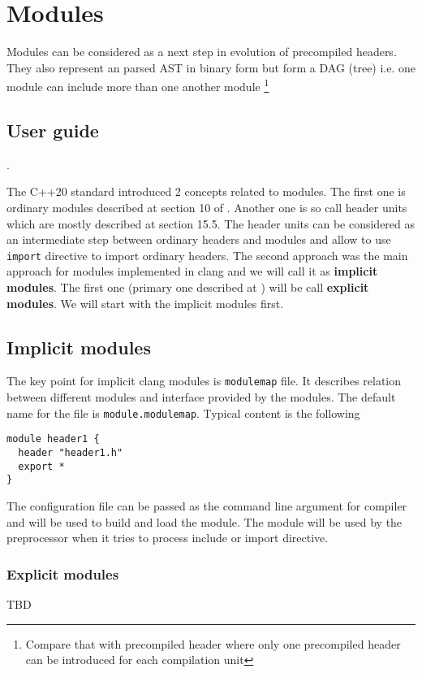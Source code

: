 \section{Modules}
Modules can be considered as a next step in evolution of precompiled
headers. They also represent an parsed AST in binary form but form a
DAG (tree) i.e. one module can include more than one another module
\footnote{Compare that with precompiled header where only one
precompiled header can be introduced for each compilation unit}
\subsection{User guide}.

The C++20 standard \cite{book:ieee_cpp_20} introduced 2 concepts
related to modules. The first one is ordinary modules described at
section 10 of \cite{book:ieee_cpp_20}. Another one is so call header
units   which are mostly described at section 15.5.
The header units can be considered as an intermediate step between
ordinary headers and modules and allow to use
\texttt{import} directive to import ordinary headers. The
second approach was the main approach for modules implemented in clang
and we will call it as \textbf{implicit modules}. The first one (primary one
described at \cite{book:ieee_cpp_20}) will be call \textbf{explicit
  modules}. We will start with the implicit modules first.

\subsection{Implicit modules}
The key point for implicit clang modules is \texttt{modulemap}
file. It describes relation between different modules and interface
provided by the modules. The default name for the file is
\texttt{module.modulemap}. Typical content is the following
\begin{verbatim}
module header1 {
  header "header1.h"
  export *
}
\end{verbatim}
The configuration file can be passed as the command line argument for
compiler and will be used to build and load the module. The module
will be used by the preprocessor when it tries to process include or
import directive.  

\subsubsection{Explicit modules}
TBD

